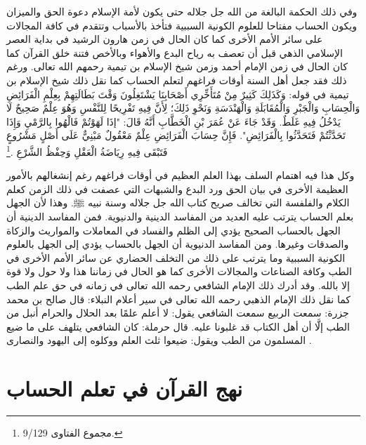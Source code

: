 وفي ذلك الحكمة البالغة من الله جل جلاله حتى يكون لأمة الإسلام دعوة الحق والميزان ويكون الحساب مفتاحا للعلوم الكونية السببية فتأخذ بالأسباب وتتقدم في كافة المجالات على سائر الأمم الأخرى كما كان الحال في زمن هارون الرشيد في بداية العصر الإسلامي الذهي قبل أن تعصف به رياح البدع والأهواء وبالأخص فتنة خلق القرآن كما كان الحال في زمن الإمام أحمد وزمن شيخ الإسلام بن تيمية رحمهم الله تعالى. ورغم ذلك فقد جعل أهل السنة أوقات فراغهم لتعلم الحساب كما نقل ذلك شيخ الإسلام بن تيمية في قوله: وَكَذَلِكَ كَثِيرٌ مِنْ مُتَأَخِّرِي أَصْحَابِنَا يَشْتَغِلُونَ وَقْتَ بَطَالَتِهِمْ بِعِلْمِ الْفَرَائِضِ وَالْحِسَابِ وَالْجَبْرِ وَالْمُقَابَلَةِ وَالْهَنْدَسَةِ وَنَحْوِ ذَلِكَ؛ لِأَنَّ فِيهِ تَفْرِيحًا لِلنَّفْسِ وَهُوَ عِلْمٌ صَحِيحٌ لَا يَدْخُلُ فِيهِ غَلَطٌ. وَقَدْ جَاءَ عَنْ عُمَرَ بْنِ الْخَطَّابِ أَنَّهُ قَالَ: "إذَا لَهَوْتُمْ فَالْهُوا بِالرَّمْيِ وَإِذَا تَحَدَّثْتُمْ فَتَحَدَّثُوا بِالْفَرَائِضِ". فَإِنَّ حِسَابَ الْفَرَائِضِ عِلْمٌ مَعْقُولٌ مَبْنِيٌّ عَلَى أَصْلٍ مَشْرُوعٍ فَتَبْقَى فِيهِ رِيَاضَةُ الْعَقْلِ وَحِفْظُ الشَّرْعِ \href{https://shamela.ws/book/7289/4394#p1}{\faExternalLink} \cite{ibnTaimia_Majmoo}.\footnote{مجموع الفتاوى 9/129.}

وكل هذا فيه اهتمام السلف بهذا العلم العظيم في أوقات فراغهم رغم إنشغالهم بالأمور العظيمة الأخرى في بيان الحق ورد البدع والشبهات التي عصفت في ذلك الزمن كعلم الكلام والفلفسة التي تخالف صريح كتاب الله جل جلاله وسنة نبيه ﷺ. وهذا لأن الجهل بعلم الحساب يترتب عليه العديد من المفاسد الدينية والدنيوية. فمن المفاسد الدينية أن الجهل بالحساب الصحيح يؤدي إلى الظلم والفساد في المعاملات والمواريث والزكاة والصدقات وغيرها. ومن المفاسد الدنيوية أن الجهل بالحساب يؤدي إلى الجهل بالعلوم الكونية السببية وما يترتب على ذلك من التخلف الحضاري عن سائر الأمم الأخرى في الطب وكافة الصناعات والمجالات الأخرى كما هو الحال في زماننا هذا ولا حول ولا قوة إلا بالله. وقد أدرك ذلك الإمام الشافعي رحمه الله تعالى في زمانه في حق علم الطب كما نقل ذلك الإمام الذهبي رحمه الله تعالى في سير أعلام النبلاء: قال صالح بن محمد جزرة: سمعت الربيع سمعت الشافعي يقول: لا أعلم علمًا بعد الحلال والحرام أنبل من الطب إلَّا أن أهل الكتاب قد غلبونا عليه. قال حرملة: كان الشافعي يتلهف على ما ضيع المسلمون من الطب ويقول: ضيعوا ثلث العلم ووكلوه إلى اليهود والنصارى \href{https://shamela.ws/book/22669/4486#p7}{\faExternalLink} \cite{dahabi_Siyar}.

\section{نهج القرآن في تعلم الحساب}

